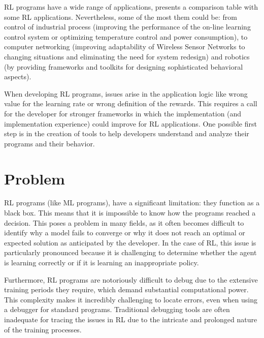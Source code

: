 \ac{RL} programs have a wide range of applications, \citet{8836506} presents a comparison table with some 
\ac{RL} applications. Nevertheless, some of the most them could be: from control of industrial process\cite{8169685} (improving 
the performance of the on-line learning control system or optimizing temperature control and power consumption),
to computer networking\cite{AlRawi2013ApplicationOR} (improving adaptability of Wireless Sensor Networks to changing situations and eliminating 
the need for system redesign) and robotics\cite{zhang2015visionbaseddeepreinforcementlearning} (by providing frameworks and toolkits for designing sophisticated 
behavioral aspects). 

When developing \ac{RL} programs, issues arise in the application logic like wrong value for the
learning rate or wrong definition of the rewards. This requires a call for the developer for stronger frameworks in which 
the implementation (and implementation experience) could improve for \ac{RL} applications. One possible first step 
is in the creation of tools to help developers understand and analyze their programs and their behavior.

\section{Problem}

\ac{RL} programs (like \ac{ML} programs), 
have a significant limitation: they function as a black box. 
This means that it is impossible to know how the programs reached a decision. This poses 
a problem in many fields, as it often becomes difficult to identify why a model 
fails to converge or why it does not reach an optimal or expected solution as 
anticipated by the developer. In the case of \ac{RL}, this issue is particularly 
pronounced because it is challenging to determine whether the agent is learning 
correctly or if it is learning an inappropriate policy.

Furthermore, \ac{RL} programs are notoriously difficult to debug due to the extensive 
training periods they require, which demand substantial computational power. This 
complexity makes it incredibly challenging to locate errors, even when using a 
debugger for standard programs. Traditional debugging tools are often inadequate 
for tracing the issues in \ac{RL} due to the intricate and prolonged nature of the 
training processes. 

